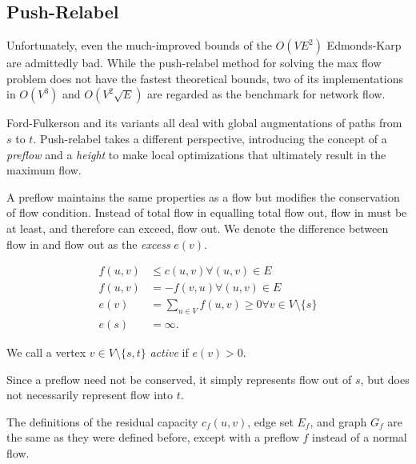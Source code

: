 \documentclass[11pt]{book}
\begin{document}
\subsection{Push-Relabel}

Unfortunately, even the much-improved bounds of the $O(VE^2)$ Edmonds-Karp are admittedly bad. While the push-relabel method for solving the max flow problem does not have the fastest theoretical bounds, two of its implementations in $O(V^3)$ and $O(V^2\sqrt{E})$ are regarded as the benchmark for network flow.

Ford-Fulkerson and its variants all deal with global augmentations of paths from $s$ to $t$. Push-relabel takes a different perspective, introducing the concept of a \textit{preflow} and a \textit{height} to make local optimizations that ultimately result in the maximum flow.

A preflow maintains the same properties as a flow but modifies the conservation of flow condition. Instead of total flow in equalling total flow out, flow in must be at least, and therefore can exceed, flow out. We denote the difference between flow in and flow out as the \textit{excess} $e(v)$.

\begin{align*}
f(u,v) &\le c(u,v) \forall (u,v) \in E \\
f(u,v) &= -f(v,u) \forall (u,v) \in E \\
e(v) &= \sum_{u \in V} f(u,v) \ge 0 \forall v \in V \setminus \{s\} \\
e(s) &= \infty.
\end{align*}

We call a vertex $v \in V \setminus \{s, t\}$ \textit{active} if $e(v) > 0$.

Since a preflow need not be conserved, it simply represents flow out of $s$, but does not necessarily represent flow into $t$.

The definitions of the residual capacity $c_f(u,v)$, edge set $E_f$, and graph $G_f$ are the same as they were defined before, except with a preflow $f$ instead of a normal flow.
\end{document}
